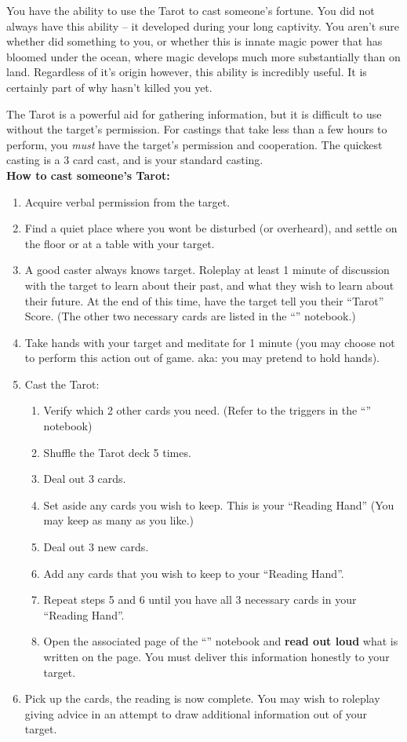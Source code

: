 \documentclass[green]{NeptuneBall}
\begin{document}
\name{\gTarot{}}

You have the ability to use the Tarot to cast someone's fortune. You did not always have this ability -- it developed during your long captivity. You aren't sure whether \cWitch{\MYname} did something to you, or whether this is innate magic power that has bloomed under the ocean, where magic develops much more substantially than on land. Regardless of it's origin however, this ability is incredibly useful. It is certainly part of why \cWitch{\MYname} hasn't killed you yet.

The Tarot is a powerful aid for gathering information, but it is difficult to use without the target's permission. For castings that take less than a few hours to perform, you \emph{must} have the target's permission and cooperation. The quickest casting is a 3 card cast, and is your standard casting.\\

{\bf How to cast someone's Tarot:} %
\begin{enumerate}
  \item Acquire verbal permission from the target.
  \item Find a quiet place where you wont be disturbed (or overheard), and settle on the floor or at a table with your target.
  \item A good caster always knows \cSlave{\their} target. Roleplay at least 1 minute of discussion with the target to learn about their past, and what they wish to learn about their future. At the end of this time, have the target tell you their ``Tarot'' Score. (The other two necessary cards are listed in the ``\mTarot{\MYname}'' notebook.)
  \item Take hands with your target and meditate for 1 minute (you may choose not to perform this action out of game. aka: you may pretend to hold hands).
  \item Cast the Tarot:
  \begin{enumerate}
    \item Verify which 2 other cards you need. (Refer to the triggers in the ``\mTarot{\MYname}'' notebook)
    \item Shuffle the Tarot deck 5 times.
    \item Deal out 3 cards.
    \item Set aside any cards you wish to keep. This is your ``Reading Hand'' (You may keep as many as you like.)
    \item Deal out 3 new cards.
    \item Add any cards that you wish to keep to your ``Reading Hand''.
    \item Repeat steps 5 and 6 until you have all 3 necessary cards in your ``Reading Hand''.
    \item Open the associated page of the ``\mTarot{\MYname}'' notebook and {\bf read out loud} what is written on the page. You must deliver this information honestly to your target.
  \end{enumerate}
  \item Pick up the cards, the reading is now complete. You may wish to roleplay giving advice in an attempt to draw additional information out of your target.
\end{enumerate}
\end{document}
